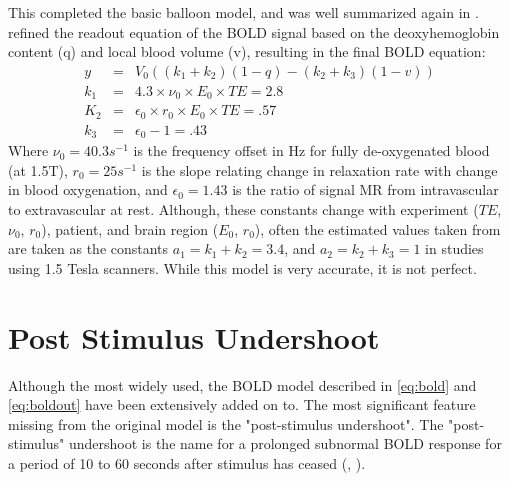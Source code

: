 This completed the basic balloon model, and was well summarized again
in \cite{Riera2003}.  \cite{Obata2004} refined the readout equation 
of the BOLD signal based on the
deoxyhemoglobin content (q) and local blood volume (v), resulting in the
final BOLD equation:
\begin{eqnarray}
y   &=& V_0((k_1 + k_2)(1-q) - (k_2 + k_3)(1-v))\\
k_1 &=& 4.3 \times \nu_0 \times E_0 \times TE = 2.8\\
K_2 &=& \epsilon_0 \times r_0 \times E_0 \times TE = .57\\
k_3 &=& \epsilon_0 - 1 = .43
\label{eq:boldout}
\end{eqnarray}
Where $\nu_0 = 40.3 s^{-1}$  is the frequency offset in Hz for fully
de-oxygenated blood (at 1.5T), $r_0 = 25 s^{-1}$  is the slope relating
change in relaxation rate with change in blood oxygenation, and
$\epsilon_0 = 1.43$ is the 
ratio of signal MR from intravascular to extravascular at rest. Although,
these constants change with experiment ($TE$, $\nu_0$, $r_0$),
patient, and brain 
region ($E_0$, $r_0$), often the estimated values taken from \cite{Obata2004} are 
taken as the constants $a_1 = k_1 + k_2 = 3.4$, and $a_2 = k_2+k_3 = 1$ in 
studies using 1.5 Tesla scanners.
While this model is very accurate, it is not perfect. 

\section{Post Stimulus Undershoot}
\label{sec:Post Stimulus Undershoot}
Although the most widely used, the BOLD model described in \autoref{eq:bold}
and \autoref{eq:boldout} have been extensively added on to. The most
significant feature missing from the original model is the 
"post-stimulus undershoot".
The "post-stimulus" undershoot is the name for a prolonged subnormal
BOLD response for a period of 10 to 60 seconds after stimulus has
ceased (\cite{Chen2009}, \cite{Mandeville1999a}).

